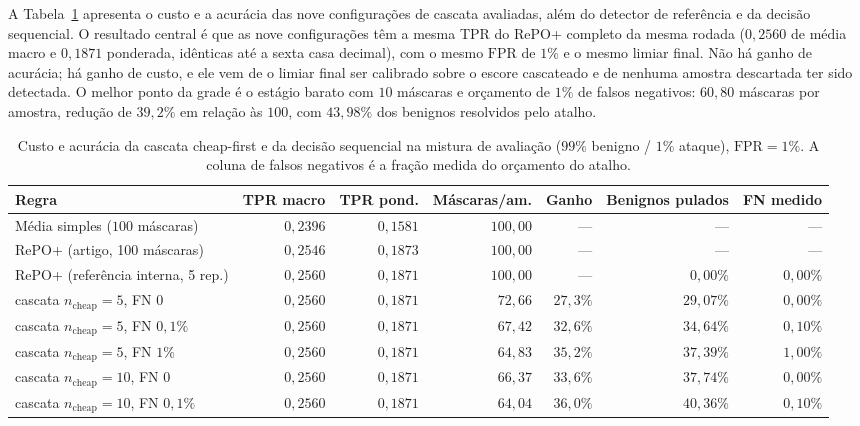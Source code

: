 \documentclass[conference]{IEEEtran}
\begin{document}
A Tabela~\ref{tab:cascata_normal} apresenta o custo e a acurácia das nove configurações de cascata avaliadas, além do detector de referência e da decisão sequencial.
O resultado central é que as nove configurações têm a mesma TPR do RePO+ completo da mesma rodada ($0{,}2560$ de média macro e $0{,}1871$ ponderada, idênticas até a sexta casa decimal), com o mesmo $\text{FPR}$ de $1\%$ e o mesmo limiar final.
Não há ganho de acurácia; há ganho de custo, e ele vem de o limiar final ser calibrado sobre o escore cascateado e de nenhuma amostra descartada ter sido detectada.
O melhor ponto da grade é o estágio barato com $10$ máscaras e orçamento de $1\%$ de falsos negativos: $60{,}80$ máscaras por amostra, redução de $39{,}2\%$ em relação às $100$, com $43{,}98\%$ dos benignos resolvidos pelo atalho.

\begin{table}[!t]
\centering
\footnotesize
\setlength{\tabcolsep}{6pt}
\caption{Custo e acurácia da cascata cheap-first e da decisão sequencial na mistura de avaliação ($99\%$ benigno / $1\%$ ataque), $\text{FPR} = 1\%$. A coluna de falsos negativos é a fração medida do orçamento do atalho.}
\label{tab:cascata_normal}
\begin{tabular}{@{}lrrrrrr@{}}
\toprule
\textbf{Regra} & \textbf{TPR macro} & \textbf{TPR pond.} & \textbf{Máscaras/am.} & \textbf{Ganho} & \textbf{Benignos pulados} & \textbf{FN medido} \\
\midrule
Média simples ($100$ máscaras) & $0{,}2396$ & $0{,}1581$ & $100{,}00$ & --- & --- & --- \\
RePO+ (artigo, 100 máscaras) & $0{,}2546$ & $0{,}1873$ & $100{,}00$ & --- & --- & --- \\
RePO+ (referência interna, 5 rep.) & $0{,}2560$ & $0{,}1871$ & $100{,}00$ & --- & $0{,}00\%$ & $0{,}00\%$ \\
\midrule
cascata $n_{\text{cheap}}=5$, FN $0$ & $0{,}2560$ & $0{,}1871$ & $72{,}66$ & $27{,}3\%$ & $29{,}07\%$ & $0{,}00\%$ \\
cascata $n_{\text{cheap}}=5$, FN $0{,}1\%$ & $0{,}2560$ & $0{,}1871$ & $67{,}42$ & $32{,}6\%$ & $34{,}64\%$ & $0{,}10\%$ \\
cascata $n_{\text{cheap}}=5$, FN $1\%$ & $0{,}2560$ & $0{,}1871$ & $64{,}83$ & $35{,}2\%$ & $37{,}39\%$ & $1{,}00\%$ \\
cascata $n_{\text{cheap}}=10$, FN $0$ & $0{,}2560$ & $0{,}1871$ & $66{,}37$ & $33{,}6\%$ & $37{,}74\%$ & $0{,}00\%$ \\
cascata $n_{\text{cheap}}=10$, FN $0{,}1\%$ & $0{,}2560$ & $0{,}1871$ & $64{,}04$ & $36{,}0\%$ & $40{,}36\%$ & $0{,}10\%$ \\

\end{tabular}
\end{table}
\end{document}
